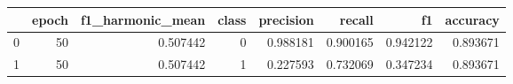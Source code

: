 \begin{tabular}{lrrrrrrr}
\toprule
 & epoch & f1_harmonic_mean & class & precision & recall & f1 & accuracy \\
\midrule
0 & 50 & 0.507442 & 0 & 0.988181 & 0.900165 & 0.942122 & 0.893671 \\
1 & 50 & 0.507442 & 1 & 0.227593 & 0.732069 & 0.347234 & 0.893671 \\
\bottomrule
\end{tabular}
